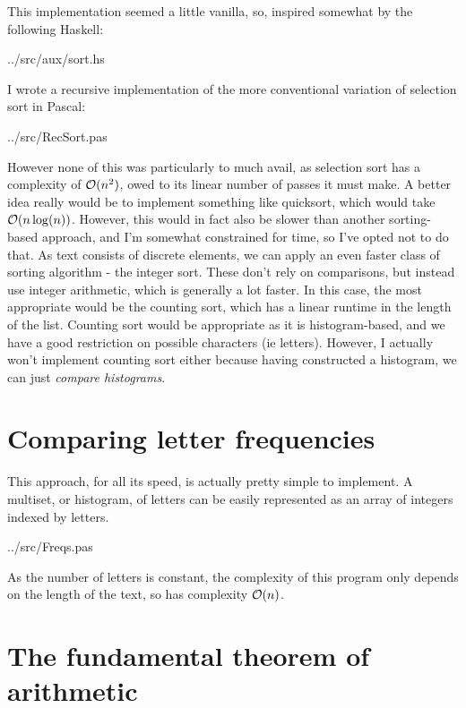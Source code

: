 \documentclass[fleqn,a4paper,11pt]{article}
\begin{document}
    This implementation seemed a little vanilla, so, inspired somewhat by the
    following Haskell:


{../src/aux/sort.hs}

    I wrote a recursive implementation of the more conventional variation of
    selection sort in Pascal:


{../src/RecSort.pas}

    However none of this was particularly to much avail, as selection sort has a
    complexity of \(\operatorname{\mathcal O}(n^2)\), owed to its linear number of passes it must
    make. A better idea really would be to implement something like quicksort,
    which would take \(\operatorname{\mathcal O}(n \log(n))\). However, this would in fact also be
    slower than another sorting-based approach, and I'm somewhat constrained for
    time, so I've opted not to do that. As text consists of discrete elements,
    we can apply an even faster class of sorting algorithm - the integer sort.
    These don't rely on comparisons, but instead use integer arithmetic, which
    is generally a lot faster. In this case, the most appropriate would be the
    counting sort, which has a linear runtime in the length of the list.
    Counting sort would be appropriate as it is histogram-based, and we have a
    good restriction on possible characters (ie letters). However, I actually
    won't implement counting sort either because having constructed a histogram,
    we can just \textit{compare histograms}.

    \section{Comparing letter frequencies}

    This approach, for all its speed, is actually pretty simple to implement. A
    multiset, or histogram, of letters can be easily represented as an array of
    integers indexed by letters.


{../src/Freqs.pas}

    As the number of letters is constant, the complexity of this program only
    depends on the length of the text, so has complexity \(\operatorname{\mathcal O}(n)\).

    \section{The fundamental theorem of arithmetic}
\end{document}
